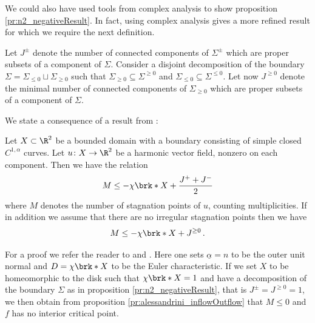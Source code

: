 We could also have used tools from complex analysis to show proposition \ref{pr:n2_negativeResult}.
In fact, using complex analysis \cite{Alessandrini1992} gives a more refined result
for which we require the next definition.

\begin{definition}
Let $J^\pm$ denote the number of connected components of $\Sigma^\pm$ which are proper
subsets of a component of $\Sigma$.
Consider a disjoint decomposition of the boundary $\Sigma=\Sigma_{\leq0}\sqcup\Sigma_{\geq0}$ such
that $\Sigma_{\geq0}\subseteq\Sigma^{\geq0}$ and $\Sigma_{\leq0}\subseteq\Sigma^{\leq0}$.
Let now $J^{\geq0}$ denote the minimal number of connected components of $\Sigma_{\geq0}$ 
which are proper subsets of a component of $\Sigma$.
\end{definition}

We state a consequence of a result from \cite[Theorem 2.1 and 2.2]{Alessandrini1992}:
\begin{proposition}\label{pr:alessandrini_inflowOutflow}
  Let $X\subset\R^2$ be a bounded domain with a boundary consisting of simple closed $C^{1,\alpha}$ curves.
  Let $u\colon X\to \R^2$ be a harmonic vector field, nonzero on each component.
  Then we have the relation
  \begin{align}
    M\leq -\chi\brk*{X}+\frac{J^++J^-}{2}\label{eq:n2_Alessandrini1}
  \end{align}
  where $M$ denotes the number of stagnation points of $u$, counting multiplicities.
  If in addition we assume that there are no irregular stagnation points then we have
  \begin{align}
    M\leq -\chi\brk*{X}+J^{\geq0}\,.\label{eq:n2_Alessandrini2}
  \end{align}
\end{proposition}
  For a proof we refer the reader to \cite[Theorem 2.1]{Alessandrini1992} and \cite[Theorem 2.2]{Alessandrini1992}. Here one sets $\underline{\alpha}=n$ to be the outer unit normal and $D=\chi\brk*{X}$
  to be the Euler characteristic.
% 
If we set $X$ to be homeomorphic to the disk such that $\chi\brk*{X}=1$ and have a
decomposition of the boundary $\Sigma$ as in proposition \ref{pr:n2_negativeResult}, that is $J^\pm=J^{\geq0}=1$,
we then obtain from proposition \ref{pr:alessandrini_inflowOutflow} that $M\leq0$
and $f$ has no interior critical point.

